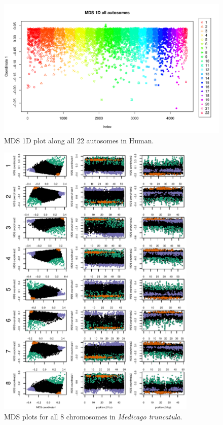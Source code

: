 \documentclass[11pt, oneside]{article}   	%
\begin{document}
\begin{figure}
    \begin{center}
       \includegraphics[width=1\textwidth]{MDS_1D_win100_all_chr_col_by_chr_with_legend}
    \end{center}
    \caption{
        MDS 1D plot along all 22 autosomes in Human.
        \label{fig:mds1_along_allchr_human}
    }
\end{figure}



\begin{figure}
    \begin{center}
       \includegraphics[width=0.85\textwidth]{FigS_Together_MDS_plot_allchr}
    \end{center}
    \caption{
        MDS plots for all 8 chromosomes in \textit{Medicago truncatula}.
        \label{fig:mds_medicago_allchr}
    }
\end{figure}
\end{document}
